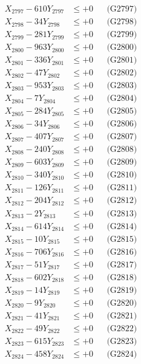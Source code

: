 \documentclass[a4paper,10pt]{article}
\begin{document}
{\begin{align}
X_{2797} - 610Y_{2797} &\leq +0 && \text{(G2797)} \\
X_{2798} - 34Y_{2798} &\leq +0 && \text{(G2798)} \\
X_{2799} - 281Y_{2799} &\leq +0 && \text{(G2799)} \\
X_{2800} - 963Y_{2800} &\leq +0 && \text{(G2800)} \\
\allowbreak
X_{2801} - 336Y_{2801} &\leq +0 && \text{(G2801)} \\
X_{2802} - 47Y_{2802} &\leq +0 && \text{(G2802)} \\
X_{2803} - 953Y_{2803} &\leq +0 && \text{(G2803)} \\
X_{2804} - 7Y_{2804} &\leq +0 && \text{(G2804)} \\
X_{2805} - 284Y_{2805} &\leq +0 && \text{(G2805)} \\
X_{2806} - 34Y_{2806} &\leq +0 && \text{(G2806)} \\
X_{2807} - 407Y_{2807} &\leq +0 && \text{(G2807)} \\
X_{2808} - 240Y_{2808} &\leq +0 && \text{(G2808)} \\
X_{2809} - 603Y_{2809} &\leq +0 && \text{(G2809)} \\
X_{2810} - 340Y_{2810} &\leq +0 && \text{(G2810)} \\
\allowbreak
X_{2811} - 126Y_{2811} &\leq +0 && \text{(G2811)} \\
X_{2812} - 204Y_{2812} &\leq +0 && \text{(G2812)} \\
X_{2813} - 2Y_{2813} &\leq +0 && \text{(G2813)} \\
X_{2814} - 614Y_{2814} &\leq +0 && \text{(G2814)} \\
X_{2815} - 10Y_{2815} &\leq +0 && \text{(G2815)} \\
X_{2816} - 706Y_{2816} &\leq +0 && \text{(G2816)} \\
X_{2817} - 51Y_{2817} &\leq +0 && \text{(G2817)} \\
X_{2818} - 602Y_{2818} &\leq +0 && \text{(G2818)} \\
X_{2819} - 14Y_{2819} &\leq +0 && \text{(G2819)} \\
X_{2820} - 9Y_{2820} &\leq +0 && \text{(G2820)} \\
\allowbreak
X_{2821} - 41Y_{2821} &\leq +0 && \text{(G2821)} \\
X_{2822} - 49Y_{2822} &\leq +0 && \text{(G2822)} \\
X_{2823} - 615Y_{2823} &\leq +0 && \text{(G2823)} \\
X_{2824} - 458Y_{2824} &\leq +0 && \text{(G2824)} \\

\end{align}}
\end{document}
